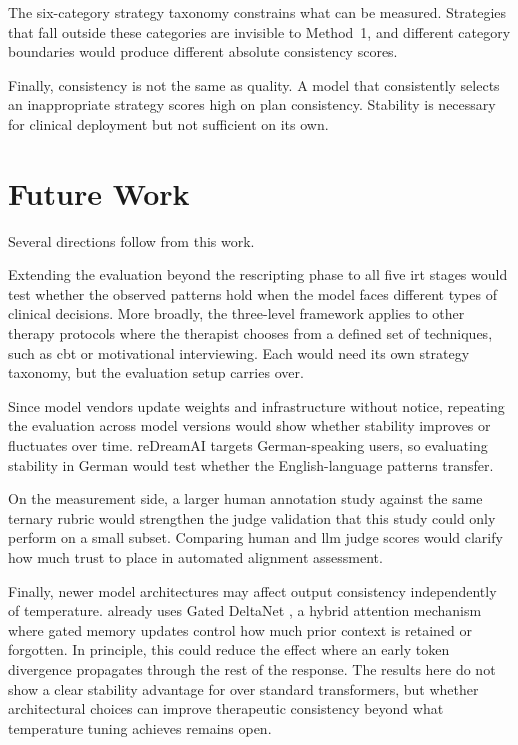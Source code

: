 The six-category strategy taxonomy constrains what can be measured.
Strategies that fall outside these categories are invisible to Method~1,
and different category boundaries would produce different absolute
consistency scores.

Finally, consistency is not the same as quality. A model that consistently
selects an inappropriate strategy scores high on plan consistency.
Stability is necessary for clinical deployment but not sufficient on its
own.


\section{Future Work}
\label{sec:concl-future}

Several directions follow from this work.

Extending the evaluation beyond the rescripting phase to all five
\gls{irt} stages would test whether the observed patterns hold when the
model faces different types of clinical decisions. More broadly, the
three-level framework applies to other therapy protocols where the
therapist chooses from a defined set of techniques, such as \gls{cbt} or
motivational interviewing. Each would need its own strategy taxonomy, but
the evaluation setup carries over.

Since model vendors update weights and infrastructure without notice,
repeating the evaluation across model versions would show whether
stability improves or fluctuates over time. reDreamAI targets
German-speaking users, so evaluating stability in German would test
whether the English-language patterns transfer.

On the measurement side, a larger human annotation study against the same
ternary rubric would strengthen the judge validation that this study could
only perform on a small subset. Comparing human and \gls{llm} judge
scores would clarify how much trust to place in automated alignment
assessment.

Finally, newer model architectures may affect output consistency
independently of temperature.  already uses Gated
DeltaNet \parencite{YJTEGJH4}, a hybrid attention mechanism where gated
memory updates control how much prior context is retained or forgotten.
In principle, this could reduce the effect where an early token divergence
propagates through the rest of the response. The results here do not show
a clear stability advantage for  over standard
transformers, but whether architectural choices can improve therapeutic
consistency beyond what temperature tuning achieves remains open.
